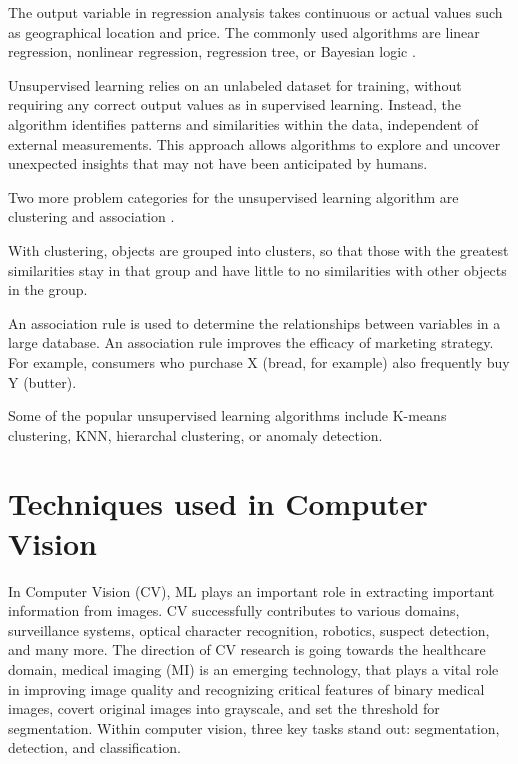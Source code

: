 The output variable in regression analysis takes continuous or actual values such as geographical location and price. The commonly used algorithms are linear regression, nonlinear regression, regression tree, or Bayesian logic \cite{land9100346}.


Unsupervised learning relies on an unlabeled dataset for training, without requiring any correct output values as in supervised learning. Instead, the algorithm identifies patterns and similarities within the data, independent of external measurements. This approach allows algorithms to explore and uncover unexpected insights that may not have been anticipated by humans.

Two more problem categories for the unsupervised learning algorithm are clustering and association \cite{Turner2016}.


With clustering, objects are grouped into clusters, so that those with the greatest similarities stay in that group and have little to no similarities with other objects in the group.


An association rule is used to determine the relationships between variables in a large database. An association rule improves the efficacy of marketing strategy. For example, consumers who purchase X (bread, for example) also frequently buy Y (butter).


Some of the popular unsupervised learning algorithms include K-means clustering, KNN, hierarchal clustering, or anomaly detection.

\section{Techniques used in Computer Vision }
In Computer Vision (CV), ML plays an important role in extracting important information from images. CV successfully contributes to various domains, surveillance systems, optical character recognition, robotics, suspect detection, and many more.  The direction of CV research is going towards the healthcare domain, medical imaging (MI) is an emerging technology, that plays a vital role in improving image quality and recognizing critical features of binary medical images, covert original images into grayscale, and set the threshold for segmentation.
Within computer vision, three key tasks stand out: segmentation, detection, and classification.

